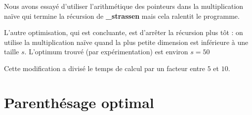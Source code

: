 \documentclass[a4paper]{article}
\begin{document}
Nous avons essayé d'utiliser l'arithmétique des pointeurs dans la
multiplication naïve qui termine la récursion de {\bf \_strassen}
mais cela ralentit le programme.

L'autre optimisation, qui est concluante, est d'arrêter la récursion
plus tôt : on utilise la multiplication naïve 
quand la plus petite dimension est inférieure à une taille
$s$. L'optimum trouvé (par expérimentation) est environ $s=50$

Cette modification a divisé le temps de calcul
par un facteur entre $5$ et $10$.

\section{Parenthésage optimal}
\end{document}
